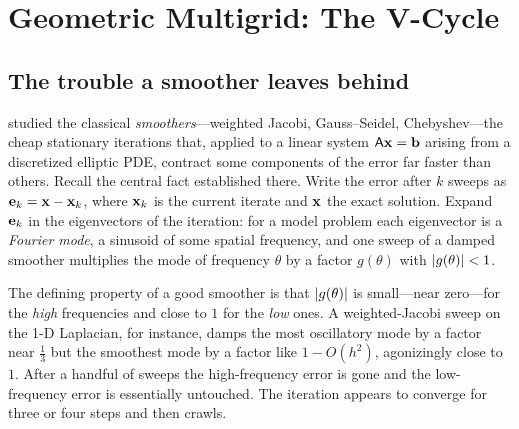 \chapter{Geometric Multigrid: The V-Cycle}
\label{ch:multigrid}


\section{The trouble a smoother leaves behind}

 studied the classical \emph{smoothers}---weighted Jacobi,
Gauss--Seidel, Chebyshev---the cheap stationary iterations that, applied to a linear
system $\mathsf{A}\mathbf{x}=\mathbf{b}$ arising from a discretized elliptic PDE, contract some
components of the error far faster than others. Recall the central fact established
there. Write the error after $k$ sweeps as $\mathbf{e}_k = \mathbf{x} - \mathbf{x}_k$, where $\mathbf{x}_k$ is
the current iterate and $\mathbf{x}$ the exact solution. Expand $\mathbf{e}_k$ in the eigenvectors
of the iteration: for a model problem each eigenvector is a \emph{Fourier mode}, a
sinusoid of some spatial frequency, and one sweep of a damped smoother multiplies
the mode of frequency $\theta$ by a factor $g(\theta)$ with $\lvert g(\theta)\rvert<1$.

The defining property of a good smoother is that $\lvert g(\theta)\rvert$ is small---near
zero---for the \emph{high} frequencies and close to $1$ for the \emph{low} ones.
A weighted-Jacobi sweep on the 1-D Laplacian, for instance, damps the most
oscillatory mode by a factor near $\tfrac13$ but the smoothest mode by a factor like
$1-O(h^2)$, agonizingly close to $1$. After a handful of sweeps the high-frequency
error is gone and the low-frequency error is essentially untouched. The iteration
appears to converge for three or four steps and then crawls.

